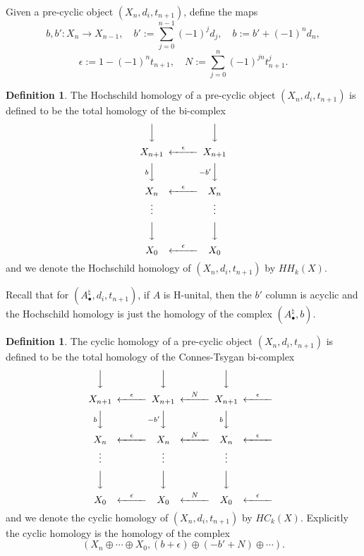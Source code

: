 \documentclass[a4paper]{amsart}
\newcommand\<{\langle}
\renewcommand\>{\rangle}
\theoremstyle{definition}
\newtheorem{dfn}[theorem]{Definition}
\theoremstyle{remark}
\begin{document}
Given a pre-cyclic object $(X_n , d_i , t_{n+1})$, define the maps
$$ b, b' : X_n \to X_{n-1} , \quad b' := \sum _{j=0}^{n-1} (-1)^j d _j, \quad b := b' + (-1)^n d _n, $$
$$ \epsilon := 1 - (-1)^n t _{n+1}, \quad N := \sum _{j=0}^n (-1)^{j n} t_{n+1} ^j .$$

\begin{dfn}
The Hochschild homology of a pre-cyclic object $(X_n , d_i , t_{n+1})$ is defined to be the total homology of the bi-complex
$$
\begin{CD}
@VVV @VVV \\
X _{n+1} @<{\epsilon}<< X _{n+1}  \\
@V{b}VV @V{-b'}VV  \\
X _{n} @<{\epsilon}<< X _{n} \\
\vdots @. \vdots  \\
@VVV @VVV \\
X _{0} @<{\epsilon}<< X _{0}
\end{CD}
$$
and we denote the Hochschild homology of $(X_n , d_i , t_{n+1})$ by $H H _k (X)$.
\end{dfn}

Recall that for $(A^\natural _\bullet, d_i, t _{n+1}) $,
if $A$ is H-unital, then the $b'$ column is acyclic and the Hochschild homology is just the homology of the complex
$ (A^\natural _\bullet , b)$.

\begin{dfn}
\label{PreCyclicHom}
The cyclic homology of a pre-cyclic object $(X_n , d_i , t_{n+1})$ is defined to be the total homology of the Connes-Tsygan bi-complex
\begin{equation}
\label{CyclicComplex}
\begin{CD}
@VVV @VVV @VVV @. \\
X _{n+1} @<{\epsilon}<< X _{n+1} @<{N}<< X _{n+1} @<{\epsilon}<< \\
@V{b}VV @V{-b'}VV @V{b}VV @. \\
X _{n} @<{\epsilon}<< X _{n} @<{N}<< X _{n} @<{\epsilon}<< \\
\vdots @. \vdots @. \vdots @. \\
@VVV @VVV @VVV @. \\
X _{0} @<{\epsilon}<< X _{0} @<{N}<< X _{0} @<{\epsilon}<<
\end{CD}
\end{equation}
and we denote the cyclic homology of $(X_n , d_i , t_{n+1})$ by $H C _k (X)$.
Explicitly the cyclic homology is the homology of the complex
$$ ( X_n \oplus \cdots \oplus X_0, (b + \epsilon) \oplus (-b'+N) \oplus \cdots ). $$
\end{dfn}
\end{document}
